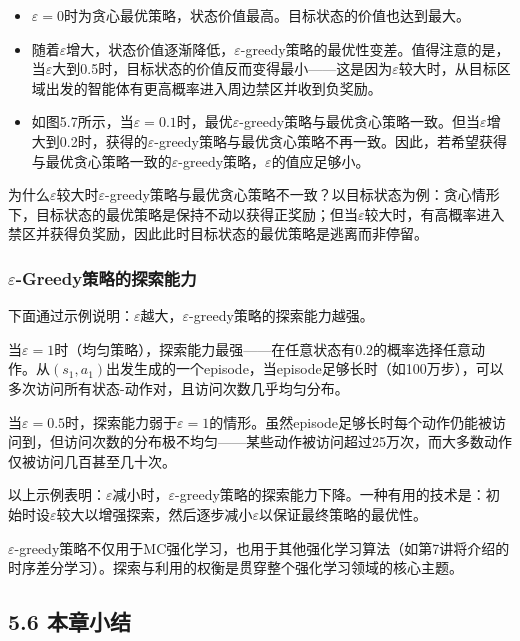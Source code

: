 \documentclass[UTF8]{article}
\begin{document}
\begin{itemize}
    \item $\varepsilon = 0$时为贪心最优策略，状态价值最高。目标状态的价值也达到最大。
    \item 随着$\varepsilon$增大，状态价值逐渐降低，$\varepsilon$-greedy策略的最优性变差。值得注意的是，当$\varepsilon$大到0.5时，目标状态的价值反而变得最小——这是因为$\varepsilon$较大时，从目标区域出发的智能体有更高概率进入周边禁区并收到负奖励。
    \item 如图5.7所示，当$\varepsilon = 0.1$时，最优$\varepsilon$-greedy策略与最优贪心策略一致。但当$\varepsilon$增大到0.2时，获得的$\varepsilon$-greedy策略与最优贪心策略不再一致。因此，若希望获得与最优贪心策略一致的$\varepsilon$-greedy策略，$\varepsilon$的值应足够小。
\end{itemize}

为什么$\varepsilon$较大时$\varepsilon$-greedy策略与最优贪心策略不一致？以目标状态为例：贪心情形下，目标状态的最优策略是保持不动以获得正奖励；但当$\varepsilon$较大时，有高概率进入禁区并获得负奖励，因此此时目标状态的最优策略是逃离而非停留。

\subsubsection*{$\varepsilon$-Greedy策略的探索能力}

下面通过示例说明：$\varepsilon$越大，$\varepsilon$-greedy策略的探索能力越强。

当$\varepsilon = 1$时（均匀策略），探索能力最强——在任意状态有0.2的概率选择任意动作。从$(s_1, a_1)$出发生成的一个episode，当episode足够长时（如100万步），可以多次访问所有状态-动作对，且访问次数几乎均匀分布。

当$\varepsilon = 0.5$时，探索能力弱于$\varepsilon = 1$的情形。虽然episode足够长时每个动作仍能被访问到，但访问次数的分布极不均匀——某些动作被访问超过25万次，而大多数动作仅被访问几百甚至几十次。

以上示例表明：$\varepsilon$减小时，$\varepsilon$-greedy策略的探索能力下降。一种有用的技术是：初始时设$\varepsilon$较大以增强探索，然后逐步减小$\varepsilon$以保证最终策略的最优性。

\begin{remarkbox}[备注]
    $\varepsilon$-greedy策略不仅用于MC强化学习，也用于其他强化学习算法（如第7讲将介绍的时序差分学习）。探索与利用的权衡是贯穿整个强化学习领域的核心主题。
\end{remarkbox}

\subsection*{5.6 本章小结}
\end{document}
